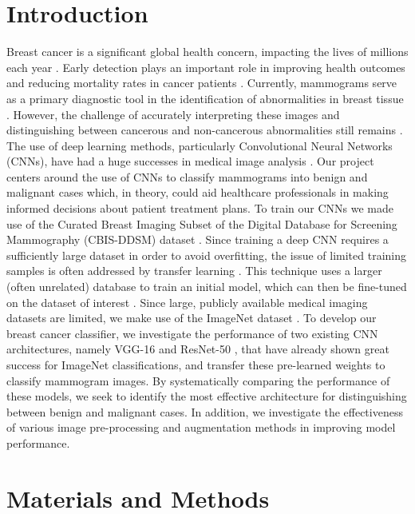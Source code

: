 \documentclass[sn-mathphys,Numbered]{sn-jnl}%
\theoremstyle{thmstyleone}%
\theoremstyle{thmstyletwo}%
\theoremstyle{thmstylethree}%
\begin{document}
\section{Introduction}\label{Introduction}
Breast cancer is a significant global health concern, impacting the lives of millions each year \cite{siegel2023cancer}. Early detection plays an important role in improving health outcomes and reducing mortality rates in cancer patients \cite{Mathew2018}. Currently, mammograms serve as a primary diagnostic tool in the identification of abnormalities in breast tissue \cite{Mathew2018}. However, the challenge of accurately interpreting these images and distinguishing between cancerous and non-cancerous abnormalities still remains \cite{elter2009}. The use of deep learning methods, particularly Convolutional Neural Networks (CNNs), have had a huge successes in medical image analysis \cite{Cai2020-hn}. Our project centers around the use of CNNs to classify mammograms into benign and malignant cases which, in theory, could aid healthcare professionals in making informed decisions about patient treatment plans. To train our CNNs we made use of the Curated Breast Imaging Subset of the Digital Database for Screening Mammography (CBIS-DDSM) dataset \cite{Lee2017-hi}. Since training a deep CNN requires a sufficiently large dataset in order to avoid overfitting, the issue of limited training samples is often addressed by transfer learning \cite{Kim2022-ge}. This technique uses a larger (often unrelated) database to train an initial model, which can then be fine-tuned on the dataset of interest \cite{Kim2022-ge}. Since large, publicly available medical imaging datasets are limited, we make use of the ImageNet dataset \cite{Deng2009-vj}. To develop our breast cancer classifier, we investigate the performance of two existing CNN architectures, namely VGG-16 \cite{simonyan2015deep} and ResNet-50 \cite{he2015deep}, that have already shown great success for ImageNet classifications, and transfer these pre-learned weights to classify mammogram images. By systematically comparing the performance of these models, we seek to identify the most effective architecture for distinguishing between benign and malignant cases. In addition, we investigate the effectiveness of various image pre-processing and augmentation methods in improving model performance.
 
\section{Materials and Methods}\label{Materials}
\end{document}
